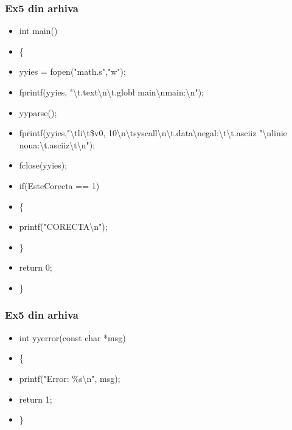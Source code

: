 \documentclass[pdf]{beamer}
\begin{document}
\begin{frame}[shrink=10]
\frametitle{Ex5 din arhiva}
\begin{itemize}
\item
int main()
\item
\{
\item \quad
	yyies = fopen("math.s","w");
\item \quad \vspace{5mm}
	fprintf(yyies, "\textbackslash{t}.text\textbackslash{n}\textbackslash{t}.globl main\textbackslash{n}main:\textbackslash{n}");
\item \quad \vspace{5mm}
	yyparse();
\item \quad 
		fprintf(yyies,"\textbackslash{t}li\textbackslash{t}\$v0, 10\textbackslash{n}\textbackslash{t}syscall\textbackslash{n}\textbackslash{t}.data\textbackslash{n}egal:\textbackslash{t}\textbackslash{t}.asciiz  "\textbackslash{n}linie\underline{ }noua:\textbackslash{t}.asciiz\textbackslash{t}\text{\textbackslash}\textbackslash{n}");
\item \quad \vspace{5mm}
	fclose(yyies);
\item \quad 
	if(EsteCorecta == 1)
\item \quad 
	\{
\item \qquad 
		printf("CORECTA\textbackslash{n}");		
\item \quad	\vspace{5mm}
	\}	
\item \qquad 
       return 0;
\item
\}
\end{itemize}
\end{frame}



\begin{frame}
\frametitle{Ex5 din arhiva}
\begin{itemize}
\item
int yyerror(const char *msg)
\item
\{
\item \quad
	printf("Error: \%s\textbackslash{n}", msg);
\item \quad
	return 1;
\item
\}
\end{itemize}
\end{frame}
\end{document}
